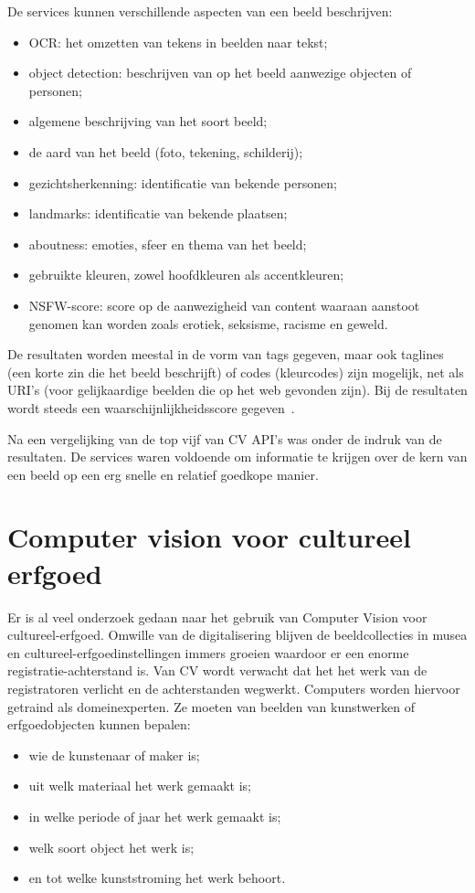 De services kunnen verschillende aspecten van een beeld beschrijven:
\begin{itemize}
	\item OCR: het omzetten van tekens in beelden naar tekst;
	\item object detection: beschrijven van op het beeld aanwezige objecten of personen;
	\item algemene beschrijving van het soort beeld;
	\item de aard van het beeld (foto, tekening, schilderij);
	\item gezichtsherkenning: identificatie van bekende personen;
	\item landmarks: identificatie van bekende plaatsen;
	\item aboutness: emoties, sfeer en thema van het beeld;
	\item gebruikte kleuren, zowel hoofdkleuren als accentkleuren;
	\item NSFW-score: score op de aanwezigheid van content waaraan aanstoot genomen kan worden zoals erotiek, seksisme, racisme en geweld.
\end{itemize}

De resultaten worden meestal in de vorm van tags gegeven, maar ook taglines (een korte zin die het beeld beschrijft) of codes (kleurcodes) zijn mogelijk, net als URI’s (voor gelijkaardige beelden die op het web gevonden zijn). Bij de resultaten wordt steeds een waarschijnlijkheidsscore gegeven~\autocite{Vanstappen2019}.

Na een vergelijking van de top vijf van CV API’s was \textcite{Oberoi2016} onder de indruk van de resultaten. De services waren voldoende om informatie te krijgen over de kern van een beeld op een erg snelle en relatief goedkope manier.

\section{Computer vision voor cultureel erfgoed}
\label{sec:cv-voor-ce}

Er is al veel onderzoek gedaan naar het gebruik van Computer Vision voor cultureel-erfgoed. Omwille van de digitalisering blijven de beeldcollecties in musea en cultureel-erfgoedinstellingen immers groeien waardoor er een enorme registratie-achterstand is. Van CV wordt verwacht dat het het werk van de registratoren verlicht en de achterstanden wegwerkt. Computers worden hiervoor getraind als domeinexperten. Ze moeten van beelden van kunstwerken of erfgoedobjecten kunnen bepalen:
\begin{itemize}
	\item wie de kunstenaar of maker is;
	\item uit welk materiaal het werk gemaakt is; 
	\item in welke periode of jaar het werk gemaakt is;
	\item welk soort object het werk is;
	\item en tot welke kunststroming het werk behoort.  
\end{itemize}

